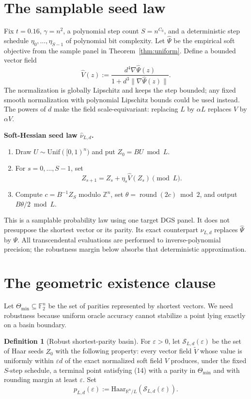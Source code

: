 \documentclass[10pt]{article}
\theoremstyle{definition}
\newtheorem{definition}[theorem]{Definition}
\newcommand{\R}{\mathbb{R}}
\newcommand{\Z}{\mathbb{Z}}
\newcommand{\F}{\mathbb{F}}
\newcommand{\Haar}{\mathrm{Haar}}
\newcommand{\Torus}{\R^n/L}
\newcommand{\norm}[1]{\lVert #1\rVert}
\newcommand{\what}{\widehat}
\newcommand{\cS}{\mathcal{S}}
\begin{document}
\section{The samplable seed law}

Fix $t=0.16$, $\gamma=n^2$, a polynomial step count $S=n^{C_0}$, and a
deterministic step schedule $\eta_0,\ldots,\eta_{S-1}$ of polynomial bit
complexity.  Let $\what\Psi$ be the empirical soft objective from the sample
panel in Theorem~\ref{thm:uniform}.  Define a bounded vector field
\[
 \what V(z):=
 \frac{d^4\nabla\what\Psi(z)}
      {1+d^3\norm{\nabla\what\Psi(z)}}.                            \tag{31}
\]
The normalization is globally Lipschitz and keeps the step bounded; any fixed
smooth normalization with polynomial Lipschitz bounds could be used instead.
The powers of $d$ make the field scale-equivariant: replacing $L$ by
$\alpha L$ replaces $V$ by $\alpha V$.

\medskip
\noindent\textbf{Soft-Hessian seed law $\widehat\nu_{L,d}$.}
\begin{enumerate}[leftmargin=2.2em,label=\arabic*.]
\item Draw $U\sim\mathrm{Unif}([0,1)^n)$ and put $Z_0=BU\bmod L$.
\item For $s=0,\ldots,S-1$, set
\[
 Z_{s+1}=Z_s+\eta_s\what V(Z_s)\pmod L.
\]
\item Compute $c=B^{-1}Z_S$ modulo $\Z^n$, set
$\theta=\operatorname{round}(2c)\bmod2$, and output $B\theta/2\bmod L$.
\end{enumerate}

This is a samplable probability law using one target DGS panel.  It does not
presuppose the shortest vector or its parity.  Its exact counterpart
$\nu_{L,d}$ replaces $\what\Psi$ by $\Psi$.  All transcendental evaluations
are performed to inverse-polynomial precision; the robustness margin below
absorbs that deterministic approximation.

\section{The geometric existence clause}                          \label{sec:basin}

Let $\Theta_{\min}\subseteq\F_2^n$ be the set of parities represented by
shortest vectors.  We need robustness because uniform oracle accuracy cannot
stabilize a point lying exactly on a basin boundary.

\begin{definition}[Robust shortest-parity basin]
For $\varepsilon>0$, let $\cS_{L,d}(\varepsilon)$ be the set of Haar seeds
$Z_0$ with the following property: every vector field $\widetilde V$ whose
value is uniformly within $\varepsilon d$ of the exact normalized soft field
$V$ produces, under the fixed $S$-step schedule, a
terminal point satisfying (14) with a parity in $\Theta_{\min}$ and with
rounding margin at least $\varepsilon$.
Set
\[
 p_{L,d}(\varepsilon)
 :=\Haar_{\Torus}(\cS_{L,d}(\varepsilon)).                          \tag{32}
\]
\end{definition}
\end{document}
